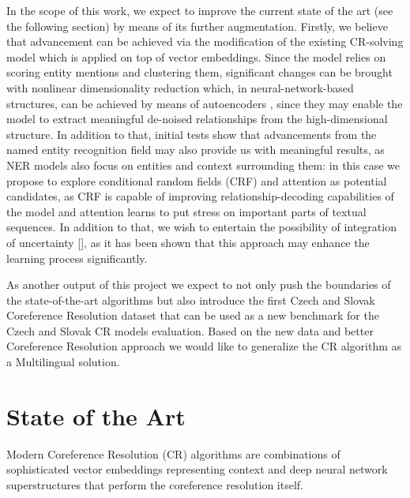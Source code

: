 In the scope of this work, we expect to improve the current state of the art (see the following section) by means of its further augmentation. Firstly, we believe that advancement can be achieved via the modification of the existing CR-solving model which is applied on top of vector embeddings. Since the model relies on scoring entity mentions and clustering them, significant changes can be brought with nonlinear dimensionality reduction which, in neural-network-based structures, can be achieved by means of autoencoders \cite{autoencoders-Zabalza2016,autoencoders-Sahay2019}, since they may enable the model to extract meaningful de-noised relationships from the high-dimensional structure. In addition to that, initial tests show that advancements from the named entity recognition field may also provide us with meaningful results, as NER models also focus on entities and context surrounding them: in this case we propose to explore conditional random fields (CRF) \cite{ner-Strakova2019,ner-Zhanming2019} and attention \cite{ner-Yamada2020} as potential candidates, as CRF is capable of improving relationship-decoding capabilities of the model and attention learns to put stress on important parts of textual sequences. In addition to that, we wish to entertain the possibility of integration of uncertainty {\color{red}[]}, as it has been shown that this approach may enhance the learning process significantly.

As another output of this project we expect to not only push the boundaries of the state-of-the-art algorithms but also introduce the first Czech and Slovak Coreference Resolution dataset that can be used as a new benchmark for the Czech and Slovak CR models evaluation. Based on the new data and better Coreference Resolution approach  we would like to generalize the CR algorithm as a Multilingual solution.


\section{State of the Art}\label{sec:sota}

Modern Coreference Resolution (CR) algorithms are combinations of sophisticated vector embeddings representing context and deep neural network superstructures that perform the coreference resolution itself. 

